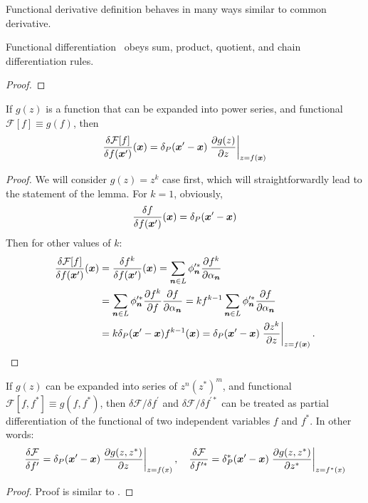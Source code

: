 Functional derivative definition behaves in many ways similar to common derivative.
\begin{lemma}
Functional differentiation~ obeys sum, product, quotient, and chain differentiation rules.
\end{lemma}
\begin{proof}
\end{proof}

\begin{lemma}
If $g(z)$ is a function that can be expanded into power series,
and functional $\mathcal{F}[f] \equiv g(f)$, then
\[
	\frac{\delta \mathcal{F}[f]}{\delta f(\boldsymbol{x}^\prime)} (\boldsymbol{x})
	= \delta_P(\boldsymbol{x}^\prime - \boldsymbol{x})
		\left. \frac{\partial g(z)}{\partial z} \right|_{z = f(\boldsymbol{x})}
\]
\end{lemma}
\begin{proof}
We will consider $g(z) = z^k$ case first, which will straightforwardly lead to the statement of the lemma.
For $k = 1$, obviously,
\[
	\frac{\delta f}{\delta f(\boldsymbol{x}^\prime)} (\boldsymbol{x})
	= \delta_P(\boldsymbol{x}^\prime - \boldsymbol{x})
\]
Then for other values of $k$:
\begin{equation*}
\begin{split}
	\frac{\delta \mathcal{F}[f]}{\delta f(\boldsymbol{x}^\prime)} (\boldsymbol{x})
	& = \frac{\delta f^k}{\delta f(\boldsymbol{x}^\prime)} (\boldsymbol{x})
	= \sum\limits_{\boldsymbol{n} \in L} \phi_{\boldsymbol{n}}^{\prime*}
		\frac{\partial f^k}{\partial \alpha_{\boldsymbol{n}}} \\
	& = \sum\limits_{\boldsymbol{n} \in L} \phi_{\boldsymbol{n}}^{\prime*}
		\frac{\partial f^k}{\partial f}
		\frac{\partial f}{\partial \alpha_{\boldsymbol{n}}}
	= k f^{k-1}
		\sum\limits_{\boldsymbol{n} \in L} \phi_{\boldsymbol{n}}^{\prime*}
		\frac{\partial f}{\partial \alpha_{\boldsymbol{n}}} \\
	& = k \delta_P(\boldsymbol{x}^\prime - \boldsymbol{x}) f^{k-1}(\boldsymbol{x})
	= \delta_P(\boldsymbol{x}^\prime - \boldsymbol{x})
		\left. \frac{\partial z^k}{\partial z} \right|_{z = f(\boldsymbol{x})}.
	\qedhere
\end{split}
\end{equation*}
\end{proof}

\begin{lemma}
If $g(z)$ can be expanded into series of $z^n (z^*)^m$,
and functional $\mathcal{F}[f, f^*] \equiv g(f, f^*)$,
then $\delta \mathcal{F} / \delta f^\prime$ and $\delta \mathcal{F} / \delta f^{\prime*}$ can be treated as partial differentiation of the functional of two independent variables $f$ and $f^*$.
In other words:
\[
	\frac{\delta \mathcal{F}}{\delta f^\prime}
	= \delta_P(\boldsymbol{x}^\prime - \boldsymbol{x}) \left.
		\frac{\partial g(z, z^*)}{\partial z}
	\right|_{z=f(x)},
	\quad
	\frac{\delta \mathcal{F}}{\delta f^{\prime*}}
	= \delta_P^*(\boldsymbol{x}^\prime - \boldsymbol{x}) \left.
		\frac{\partial g(z, z^*)}{\partial z^*}
	\right|_{z=f^*(x)}
\]
\end{lemma}
\begin{proof}
Proof is similar to .
\end{proof}
